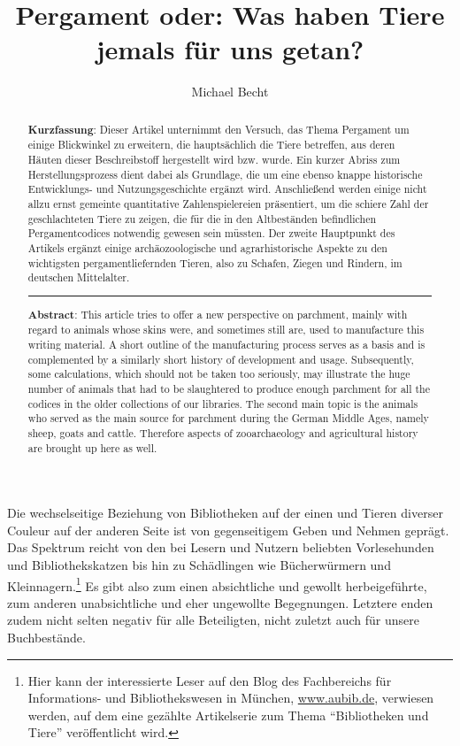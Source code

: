 \documentclass[a4paper,
fontsize=11pt,
oneside,
numbers=noperiodatend,
parskip=half-,
bibliography=totoc,
final
]{scrartcl}
\title{\LARGE{Pergament oder: Was haben Tiere jemals für uns getan?}}%
\author{Michael Becht} %
\date{}
\begin{document}
\maketitle
\thispagestyle{fancyplain} 

\begin{abstract}
\noindent
\textbf{Kurzfassung}: Dieser Artikel unternimmt den Versuch, das Thema
Pergament um einige Blickwinkel zu erweitern, die hauptsächlich die
Tiere betreffen, aus deren Häuten dieser Beschreibstoff hergestellt wird
bzw. wurde. Ein kurzer Abriss zum Herstellungsprozess dient dabei als
Grundlage, die um eine ebenso knappe historische Entwicklungs- und
Nutzungsgeschichte ergänzt wird. Anschließend werden einige nicht allzu
ernst gemeinte quantitative Zahlenspielereien präsentiert, um die
schiere Zahl der geschlachteten Tiere zu zeigen, die für die in den
Altbeständen befindlichen Pergamentcodices notwendig gewesen sein
müssten. Der zweite Hauptpunkt des Artikels ergänzt einige
archäozoologische und agrarhistorische Aspekte zu den wichtigsten
pergamentliefernden Tieren, also zu Schafen, Ziegen und Rindern, im
deutschen Mittelalter.

\begin{center}\rule{0.5\linewidth}{0.5pt}\end{center}

\noindent
\textbf{Abstract}: This article tries to offer a new perspective on
parchment, mainly with regard to animals whose skins were, and sometimes
still are, used to manufacture this writing material. A short outline of
the manufacturing process serves as a basis and is complemented by a
similarly short history of development and usage. Subsequently, some
calculations, which should not be taken too seriously, may illustrate
the huge number of animals that had to be slaughtered to produce enough
parchment for all the codices in the older collections of our libraries.
The second main topic is the animals who served as the main source for
parchment during the German Middle Ages, namely sheep, goats and cattle.
Therefore aspects of zooarchaeology and agricultural history are brought
up here as well.
\end{abstract}

Die wechselseitige Beziehung von Bibliotheken auf der einen und Tieren
diverser Couleur auf der anderen Seite ist von gegenseitigem Geben und
Nehmen geprägt. Das Spektrum reicht von den bei Lesern und Nutzern
beliebten Vorlesehunden und Bibliothekskatzen bis hin zu Schädlingen wie
Bücherwürmern und Kleinnagern.\footnote{Hier kann der interessierte
  Leser auf den Blog des Fachbereichs für Informations- und
  Bibliothekswesen in München,
  \href{http://www.aubib.de/}{{www.aubib.de}}, verwiesen werden, auf dem
  eine gezählte Artikelserie zum Thema \enquote{Bibliotheken und Tiere}
  veröffentlicht wird.} Es gibt also zum einen absichtliche und gewollt
herbeigeführte, zum anderen unabsichtliche und eher ungewollte
Begegnungen. Letztere enden zudem nicht selten negativ für alle
Beteiligten, nicht zuletzt auch für unsere Buchbestände.
\end{document}

